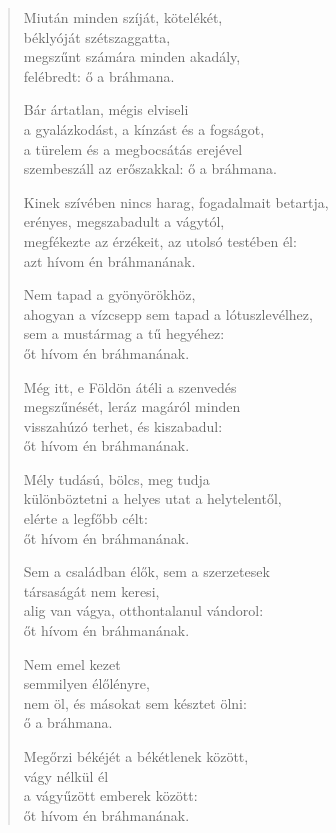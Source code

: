 \begin{verse}
 Miután minden szíját, kötelékét,\\
béklyóját szétszaggatta,\\
megszűnt számára minden akadály,\\
felébredt: ő a bráhmana.

 Bár ártatlan, mégis elviseli\\
a gyalázkodást, a kínzást és a fogságot,\\
a türelem és a megbocsátás erejével\\
szembeszáll az erőszakkal: ő a bráhmana.

 Kinek szívében nincs harag, fogadalmait betartja,\\
erényes, megszabadult a vágytól,\\
megfékezte az érzékeit, az utolsó testében él:\\
azt hívom én bráhmanának.

 Nem tapad a gyönyörökhöz,\\
ahogyan a vízcsepp sem tapad a lótuszlevélhez,\\
sem a mustármag a tű hegyéhez:\\
őt hívom én bráhmanának.

 Még itt, e Földön átéli a szenvedés\\
megszűnését, leráz magáról minden\\
visszahúzó terhet, és kiszabadul:\\
őt hívom én bráhmanának.

 Mély tudású, bölcs, meg tudja\\
különböztetni a helyes utat a helytelentől,\\
elérte a legfőbb célt:\\
őt hívom én bráhmanának.

 Sem a családban élők, sem a szerzetesek\\
társaságát nem keresi,\\
alig van vágya, otthontalanul vándorol:\\
őt hívom én bráhmanának.

 Nem emel kezet\\
semmilyen élőlényre,\\
nem öl, és másokat sem késztet ölni:\\
ő a bráhmana.

 Megőrzi békéjét a békétlenek között,\\
vágy nélkül él\\
a vágyűzött emberek között:\\
őt hívom én bráhmanának.


\end{verse}
